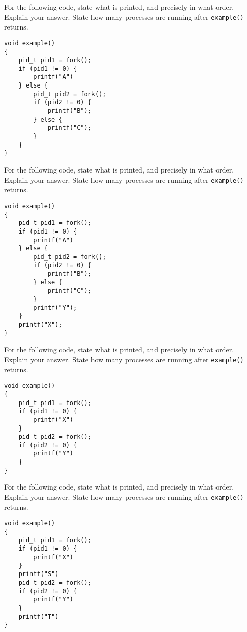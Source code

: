 \frmrule


\begin{example}
For the following code, state what is printed, and precisely in what order.
Explain your answer. State how many processes are running 
after \lstinline{example()} returns.
\begin{lstlisting}
void example()
{
	pid_t pid1 = fork();
	if (pid1 != 0) {
		printf("A")
	} else {
		pid_t pid2 = fork();
		if (pid2 != 0) {
			printf("B");
		} else {
			printf("C");
		}
	} 
}
\end{lstlisting}
\end{example}


\frmrule

\begin{example}
For the following code, state what is printed, and precisely in what order.
Explain your answer. State how many processes are running 
after \lstinline{example()} returns.
\begin{lstlisting}
void example()
{
	pid_t pid1 = fork();
	if (pid1 != 0) {
		printf("A")
	} else {
		pid_t pid2 = fork();
		if (pid2 != 0) {
			printf("B");
		} else {
			printf("C");
		}
		printf("Y");
	} 
	printf("X");
}
\end{lstlisting}
\end{example}

\frmrule

\begin{example}
For the following code, state what is printed, and precisely in what order.
Explain your answer. State how many processes are running 
after \lstinline{example()} returns.
\begin{lstlisting}
void example()
{
	pid_t pid1 = fork();
	if (pid1 != 0) {
		printf("X")
	}
	pid_t pid2 = fork();
	if (pid2 != 0) {
		printf("Y")
	}
}
\end{lstlisting}
\end{example}

\frmrule

\begin{example}
For the following code, state what is printed, and precisely in what order.
Explain your answer. State how many processes are running 
after \lstinline{example()} returns.
\begin{lstlisting}
void example()
{
	pid_t pid1 = fork();
	if (pid1 != 0) {
		printf("X")
	}
	printf("S")
	pid_t pid2 = fork();
	if (pid2 != 0) {
		printf("Y")
	}
	printf("T")
}
\end{lstlisting}
\end{example}



